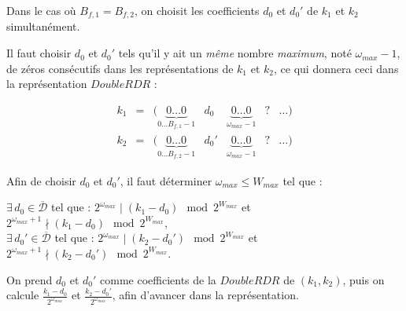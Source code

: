 \documentclass[12pt, a4paper]{memoir}
\newcommand{\dbarre}{\overline{\mathcal{D}}}
\begin{document}
 Dans le cas où $B_{f,1} = B_{f,2}$, on choisit les coefficients $d_0$ et $d_0'$ de $k_1$ et $k_2$ simultanément.
 
 Il faut choisir $d_0$ et $d_0'$ tels qu'il y ait un \emph{même} nombre \emph{maximum}, noté $\omega_{max}-1$, de zéros consécutifs dans les représentations
 de $k_1$ et $k_2$, ce qui donnera ceci dans la représentation $DoubleRDR$ :
 
      $$\begin{array}{ccccccc}
   k_1 & = & (\underbrace{0 \ldots 0}_{0 \ldots B_{f,1} - 1} & d_0 & \underbrace{0 \ldots 0}_{\omega_{max}-1} & ? & \ldots) \\
   k_2 & = & (\underbrace{0 \ldots 0}_{0 \ldots B_{f,2} - 1} & d_0' & \underbrace{0 \ldots 0}_{\omega_{max}-1} & ? & \ldots)
   \end{array}$$
 
 Afin de choisir $d_0$ et $d_0'$, il faut déterminer $\omega_{max} \leq W_{max}$ tel que :
 \begin{center}
 $\exists \, d_0 \in \dbarre$ tel que : $2^{\omega_{max}} \mid (k_1 - d_0) \mod 2^{W_{max}}$ et $2^{\omega_{max}+1} \nmid (k_1 - d_0) \mod 2^{W_{max}}$, \\
 $\exists \, d_0' \in \dbarre$ tel que : $2^{\omega_{max}} \mid (k_2 - d_0') \mod 2^{W_{max}}$ et $2^{\omega_{max}+1} \nmid (k_2 - d_0') \mod 2^{W_{max}}$.
 \end{center}
 
 On prend $d_0$ et $d_0'$ comme coefficients de la $DoubleRDR$ de $(k_1,k_2)$, puis on calcule
 $\frac{k_1-d_0}{2^{\omega_{max}}}$ et $\frac{k_2-d_0'}{2^{\omega_{max}}}$, afin d'avancer dans la représentation.
 
\end{document}
